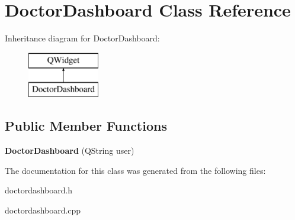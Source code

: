 \hypertarget{class_doctor_dashboard}{}\section{Doctor\+Dashboard Class Reference}
\label{class_doctor_dashboard}
Inheritance diagram for Doctor\+Dashboard\+:\begin{figure}[H]
\begin{center}
\leavevmode
\includegraphics[height=2.000000cm]{class_doctor_dashboard}
\end{center}
\end{figure}
\subsection*{Public Member Functions}
\begin{DoxyCompactItemize}
\item 
\mbox{\label{class_doctor_dashboard_aca23b27e7966fd12fc1b34f918e788b3}} 
{\bfseries Doctor\+Dashboard} (Q\+String user)
\end{DoxyCompactItemize}


The documentation for this class was generated from the following files\+:\begin{DoxyCompactItemize}
\item 
doctordashboard.\+h\item 
doctordashboard.\+cpp\end{DoxyCompactItemize}
